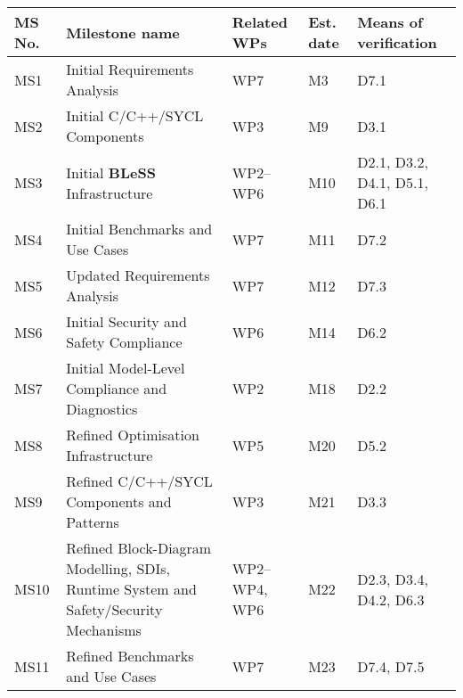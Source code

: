 \documentclass[a4paper,11pt]{article}
\newcommand{\project}[1]{\textbf{#1}\xspace}
\newcommand{\BLESS}{\project{BLeSS}}
\newcommand{\TheProject}{\BLESS}
\begin{document}
\newpage



\label{sect:milestones}

\bigskip

\renewcommand{\thems}{MS\arabic{ms}}
\begin{minipage}{\textwidth}
\begin{center}
 \begin{tabular*}{\textwidth}{|p{1.5cm}|p{8.3cm}|p{1.2cm}|p{0.6cm}|p{4.2cm}|}  \hline
 \textbf{MS No.} & \textbf{Milestone name} & \textbf{Related WPs} & \textbf{Est. date} & \textbf{Means of
   verification} \\ %
\hline
MS1 & Initial Requirements Analysis & WP7 & M3 & D7.1 \\
\hline 
MS2 & Initial C/C++/SYCL Components & WP3 & M9 & D3.1 \\
\hline
MS3 & Initial \TheProject{} Infrastructure & WP2--WP6 & M10 & D2.1, D3.2, D4.1, D5.1, D6.1 \\
\hline
MS4 & Initial Benchmarks and Use Cases & WP7 & M11 & D7.2 \\
\hline
MS5 & Updated Requirements Analysis & WP7 & M12 & D7.3 \\
\hline
MS6 & Initial Security and Safety Compliance & WP6 & M14 & D6.2 \\
\hline
MS7 & Initial Model-Level Compliance and Diagnostics & WP2 & M18 & D2.2 \\
\hline
MS8 & Refined Optimisation Infrastructure & WP5 & M20 & D5.2 \\
\hline
MS9 & Refined C/C++/SYCL Components and Patterns & WP3 & M21 & D3.3 \\ 
\hline
MS10 & Refined Block-Diagram Modelling, SDIs, Runtime System and Safety/Security Mechanisms & WP2--WP4, WP6 & M22 & D2.3, D3.4, D4.2, D6.3 \\
\hline
MS11 & Refined Benchmarks and Use Cases & WP7 & M23 & D7.4, D7.5 \\

\end{tabular*}
\end{center}
\end{minipage}
\end{document}
